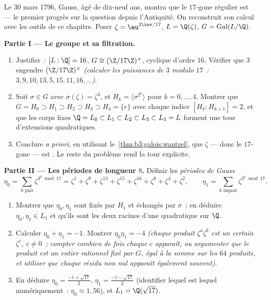 \begin{problem}\label{pb:b3:galois:1}
Le 30 mars 1796, Gauss, âgé de dix-neuf ans, montra que le
$17$-gone régulier est  --- le premier progrès sur
la question depuis l'Antiquité. On reconstruit son calcul avec
les outils de ce chapitre. Poser $\zeta = \eu^{2\iu\pi/17}$, $L
= \Q(\zeta)$, $G = \operatorname{Gal}(L/\Q)$.

\medskip
\noindent\textbf{Partie I --- Le groupe et sa filtration.}
\begin{enumerate}
  \item Justifier~: $[L:\Q] = 16$, $G \cong (\Z/17\Z)^\times$,
        cyclique d'ordre $16$. Vérifier que $3$ engendre
        $(\Z/17\Z)^\times$ \emph{(calculer les puissances de
        $3$ modulo $17$~: $3, 9, 10, 13, 5, 15, 11, 16,
        \dots$)}.
  \item Soit $\sigma \in G$ avec $\sigma(\zeta) = \zeta^3$, et
        $H_k = \langle \sigma^{2^k}\rangle$ pour $k = 0, \dots,
        4$. Montrer que $G = H_0 \supset H_1 \supset H_2
        \supset H_3 \supset H_4 = \{e\}$ avec chaque indice
        $[H_k : H_{k+1}] = 2$, et que les corps fixes $\Q =
        L_0 \subset L_1 \subset L_2 \subset L_3 \subset L_4 =
        L$ forment une tour d'extensions quadratiques.
  \item Conclure \emph{a priori}, en utilisant
        le~\cref{thm:b3:galois:wantzel}, que $\zeta$ --- donc
        le $17$-gone --- est . Le reste du
        problème rend la tour explicite.
\end{enumerate}

\medskip
\noindent\textbf{Partie II --- Les périodes de longueur $8$.}
Définir les \emph{périodes de Gauss}
\[
\eta_0 = \sum_{k \text{ pair}} \zeta^{3^k \bmod 17}
= \zeta^{1} + \zeta^{9} + \zeta^{13} + \zeta^{15} + \zeta^{16} +
\zeta^{8} + \zeta^{4} + \zeta^{2},
\qquad
\eta_1 = \sum_{k \text{ impair}} \zeta^{3^k \bmod 17}.
\]
\begin{enumerate}[resume]
  \item Montrer que $\eta_0, \eta_1$ sont fixés par $H_1$ et
        échangés par $\sigma$~; en déduire $\eta_0, \eta_1 \in
        L_1$ et qu'ils sont les deux racines d'une quadratique
        sur $\Q$.
  \item Calculer $\eta_0 + \eta_1 = -1$. Montrer $\eta_0\eta_1
        = -4$ \emph{(chaque produit $\zeta^a\zeta^b$ est un
        certain $\zeta^c$, $c \neq 0$~; compter combien de
        fois chaque $c$ apparaît, ou argumenter que le produit
        est un entier rationnel fixé par $G$, égal à la somme
        sur les $64$ produits, et utiliser que chaque résidu
        non nul apparaît également souvent)}.
  \item En déduire $\eta_0 = \frac{-1 + \sqrt{17}}2$, $\eta_1 =
        \frac{-1-\sqrt{17}}2$ (identifier lequel est lequel
        numériquement~: $\eta_0 \approx 1{,}56$), et $L_1 =
        \Q(\sqrt{17})$.
\end{enumerate}


\end{problem}
